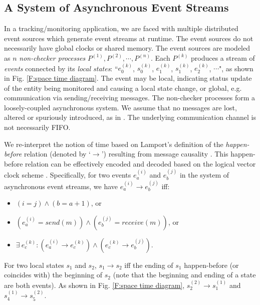 \documentclass[12pt,journal,letterpaper,compsoc]{IEEEtran}
\begin{document}
\subsection{A System of Asynchronous Event Streams}

In a tracking/monitoring application, we are faced with multiple distributed event sources which generate event streams at runtime. The event sources do not necessarily have global clocks or shared memory. The event sources are modeled as $n$ {\it non-checker processes} $P^{(1)}, P^{(2)}, \cdots, P^{(n)}$. Each $P^{(k)}$ produces a stream of {\it events} connected by its {\it local states}: ``$e^{(k)}_0$, $s^{(k)}_0$, $e^{(k)}_1$, $s^{(k)}_1$, $e^{(k)}_2$, $\cdots$", as shown in Fig. \ref{F:space time diagram}. The event may be local, indicating status update of the entity being monitored and causing a local state change, or global, e.g. communication via sending/receiving messages. The non-checker processes form a loosely-coupled asynchronous system. We assume that no messages are lost, altered or spuriously introduced, as in \cite{Garg94, Garg96}. The underlying communication channel is not necessarily FIFO.

We re-interpret the notion of time based on Lamport's definition of the {\it happen-before} relation (denoted by `$\rightarrow$') resulting from message causality \cite{Lamport78}. This happen-before relation can be effectively encoded and decoded based on the logical vector clock scheme \cite{Mattern89}. Specifically, for two events $e^{(i)}_a$ and $e^{(j)}_b$ in the system of asynchronous event streams, we have $e^{(i)}_a \rightarrow e^{(j)}_b$ iff:

\begin{itemize}
  \item $(i = j) \wedge (b = a + 1)$, or
  \item $(e^{(i)}_a = send(m)) \wedge (e^{(j)}_b = receive(m))$, or
  \item $\exists \ e^{(k)}_c : (e^{(i)}_a\rightarrow e^{(k)}_c) \wedge (e^{(k)}_c\rightarrow e^{(j)}_b)$.
\end{itemize}

\noindent For two local states $s_1$ and $s_2$, $s_1 \rightarrow s_2$ iff the ending of $s_1$ happen-before (or coincides with) the beginning of $s_2$ (note that the beginning and ending of a state are both events). As shown in Fig. \ref{F:space time diagram}, $s^{(2)}_{2} \rightarrow s^{(1)}_{1}$ and $s^{(1)}_{4} \rightarrow s^{(2)}_{5}$.
\end{document}

